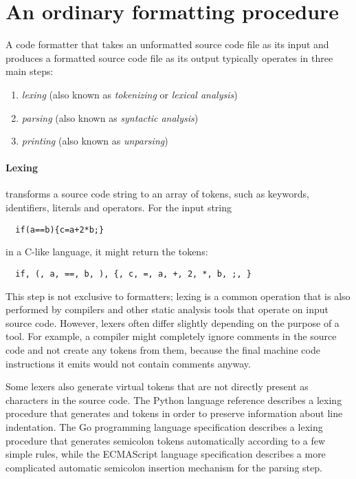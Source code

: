 \section{An ordinary formatting procedure}
A code formatter that takes an unformatted source code file as its input and
produces a formatted source code file as its output typically operates in three main steps:
\begin{enumerate}
  \item \textit{lexing} (also known as \textit{tokenizing} or \textit{lexical analysis})
  \item \textit{parsing} (also known as \textit{syntactic analysis})
  \item \textit{printing} (also known as \textit{unparsing}\autocite{prettyprinting})
\end{enumerate}

\paragraph{Lexing} transforms a source code string to an array of tokens,
such as keywords, identifiers, literals and operators.
For the input string
\begin{verbatim}
  if(a==b){c=a+2*b;}
\end{verbatim}
in a C-like language, it might return the tokens:
\begin{verbatim}
  if, (, a, ==, b, ), {, c, =, a, +, 2, *, b, ;, }
\end{verbatim}

This step is not exclusive to formatters; lexing is a common operation that is also performed by
compilers and other static analysis tools that operate on input source code.
However, lexers often differ slightly depending on the purpose of a tool.
For example, a compiler might completely ignore comments in the source code and
not create any tokens from them, because the final machine code instructions it emits
would not contain comments anyway.

Some lexers also generate virtual tokens that are not directly present as characters in the source code.
The Python language reference describes a lexing procedure that generates
 and  tokens in order to preserve information about line indentation.
\autocite[Chapter: 2.1.8. (Lexical Analysis --- Line Structure --- Indentation)]{pythonLangRef}
The Go programming language specification describes a lexing procedure
that generates semicolon tokens automatically according to a few simple rules,
\autocite[Chapter: Lexical Elements --- Semicolons]{goProgLangSpec}
while the ECMAScript language specification describes a more complicated
automatic semicolon insertion mechanism for the parsing step.
\autocite[Chapter: 11.9 (Lexical Grammar --- Automatic Semicolon Insertion)]{ecmascriptSpec}

